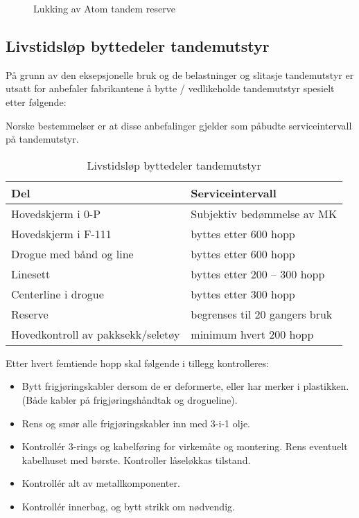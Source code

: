 \begin{figure}
	\caption{Lukking av Atom tandem reserve}
\end{figure}

\subsection{Livstidsløp byttedeler tandemutstyr}
På grunn av den eksepsjonelle bruk og de belastninger og slitasje tandemutstyr er utsatt for anbefaler fabrikantene å bytte / vedlikeholde tandemutstyr spesielt etter følgende:

Norske bestemmelser er at disse anbefalinger gjelder som påbudte serviceintervall på tandemutstyr.

\begin{table}
	\caption{Livstidsløp byttedeler tandemutstyr}
	\begin{tabular}{ | l | l | }
		\hline
		Del & Serviceintervall \\
		\hline
		Hovedskjerm i 0-P & Subjektiv bedømmelse av MK \\
		\hline
		Hovedskjerm i F-111 & byttes etter 600 hopp \\
		\hline
		Drogue med bånd og line & byttes etter 600 hopp \\
		\hline
		Linesett & byttes etter 200 – 300 hopp \\
		\hline
		Centerline i drogue & byttes etter 300 hopp \\
		\hline
		Reserve & begrenses til 20 gangers bruk \\
		\hline
		Hovedkontroll av pakksekk/seletøy & minimum hvert 200 hopp \\
		\hline
	\end{tabular}
\end{table}

Etter hvert femtiende hopp skal følgende i tillegg kontrolleres:
\begin{itemize}
	\item Bytt frigjøringskabler dersom de er deformerte, eller har merker i plastikken. (Både kabler på frigjøringshåndtak og drogueline).
	\item Rens og smør alle frigjøringskabler inn med 3-i-1 olje.
	\item Kontrollér 3-rings og kabelføring for virkemåte og montering. Rens eventuelt kabelhuset med børste. Kontroller låseløkkas tilstand.
	\item Kontrollér alt av metallkomponenter.
	\item Kontrollér innerbag, og bytt strikk om nødvendig.
\end{itemize}

